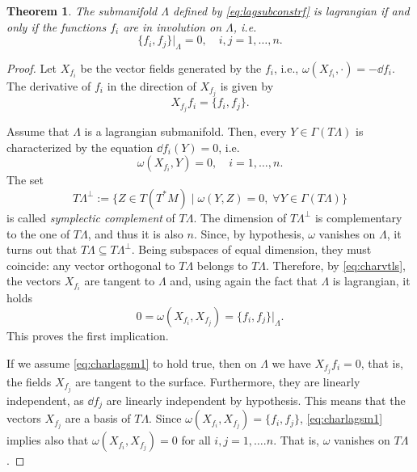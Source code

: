 \documentclass[english,fontsize=11pt,paper=b5]{scrbook}
\newtheorem{theorem}{Theorem}[chapter]
\theoremstyle{definition}
\begin{document}
    \begin{theorem}
      The submanifold $\Lambda$ defined by \eqref{eq:lagsubconstrf} is lagrangian if and only if the functions $f_i$ are in involution on $\Lambda$, i.e.
      \begin{equation}\label{eq:charlagsm1}
        \big\{f_i, f_j\big\}\big|_\Lambda = 0, \quad i,j = 1,\ldots,n.
      \end{equation}
    \end{theorem}
    \begin{proof}
      Let $X_{f_i}$ be the vector fields generated by the $f_i$, i.e., $\omega(X_{f_i}, \cdot)=-\dd f_i$. The derivative of $f_i$ in the direction of $X_{f_j}$ is given by
      \begin{equation}
        X_{f_j}f_i = \big\{f_i,f_j\big\}.
      \end{equation}

      Assume that $\Lambda$ is a lagrangian submanifold.
      Then, every $Y\in \Gamma(T\Lambda)$ is characterized by the equation $\dd f_i(Y) = 0$, i.e.
      \begin{equation}\label{eq:charvtls}
        \omega(X_{f_i}, Y) = 0, \quad i=1,\ldots,n.
      \end{equation}
      The set
      \begin{equation}
        T\Lambda^\perp := \big\{Z\in T(T^*M) \mid \omega(Y,Z) = 0, \; \forall Y\in \Gamma(T\Lambda)\big\}
      \end{equation}
      is called \emph{symplectic complement} of $T\Lambda$. The dimension of $T\Lambda^\perp$ is complementary to the one of $T\Lambda$, and thus it is also $n$. Since, by hypothesis, $\omega$ vanishes on $\Lambda$, it turns out that $T\Lambda \subseteq T\Lambda^\perp$. Being subspaces of equal dimension, they must coincide: any vector orthogonal to $T\Lambda$ belongs to $T\Lambda$.
      Therefore, by \eqref{eq:charvtls}, the vectors $X_{f_i}$ are tangent to $\Lambda$ and, using again the fact that $\Lambda$ is lagrangian, it holds
      \begin{equation}
        0 = \omega(X_{f_i}, X_{f_j}) = \big\{f_i, f_j\big\}\big|_\Lambda.
      \end{equation}
      This proves the first implication.

      If we assume \eqref{eq:charlagsm1} to hold true, then on $\Lambda$ we have $X_{f_j}f_i = 0$, that is, the fields $X_{f_j}$ are tangent to the surface. Furthermore, they are linearly independent, as $\dd f_j$ are linearly independent by hypothesis.
      This means that the vectors $X_{f_j}$ are a basis of $T\Lambda$.
      Since $\omega(X_{f_i}, X_{f_j}) = \big\{f_i,f_j\big\}$, \eqref{eq:charlagsm1} implies also that $\omega(X_{f_i}, X_{f_j}) = 0$ for all $i,j=1,\ldots.n$. That is, $\omega$ vanishes on $T\Lambda$.
    \end{proof}
\end{document}

